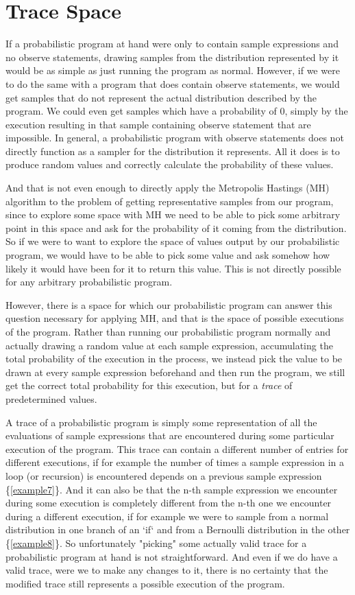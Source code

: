 \section{Trace Space}

If a probabilistic program at hand were only to contain sample expressions and no observe statements, drawing samples from the distribution represented by it would be as simple as just running the program as normal. However, if we were to do the same with a program that does contain observe statements, we would get samples that do not represent the actual distribution described by the program. We could even get samples which have a probability of $0$, simply by the execution resulting in that sample containing observe statement that are impossible. In general, a probabilistic program with observe statements does not directly function as a sampler for the distribution it represents. All it does is to produce random values and correctly calculate the probability of these values.

And that is not even enough to directly apply the Metropolis Hastings (MH) algorithm to the problem of getting representative samples from our program, since to explore some space with MH we need to be able to pick some arbitrary point in this space and ask for the probability of it coming from the distribution. So if we were to want to explore the space of values output by our probabilistic program, we would have to be able to pick some value and ask somehow how likely it would have been for it to return this value. This is not directly possible for any arbitrary probabilistic program.

However, there is a space for which our probabilistic program can answer this question necessary for applying MH, and that is the space of possible executions of the program. Rather than running our probabilistic program normally and actually drawing a random value at each sample expression, accumulating the total probability of the execution in the process, we instead pick the value to be drawn at every sample expression beforehand and then run the program, we still get the correct total probability for this execution, but for a \textit{trace} of predetermined values.

A trace of a probabilistic program is simply some representation of all the evaluations of sample expressions that are encountered during some particular execution of the program. This trace can contain a different number of entries for different executions, if for example the number of times a sample expression in a loop (or recursion) is encountered depends on a previous sample expression \{\ref{example7}\}. And it can also be that the n-th sample expression we encounter during some execution is completely different from the n-th one we encounter during a different execution, if for example we were to sample from a normal distribution in one branch of an `if` and from a Bernoulli distribution in the other \{\ref{example8}\}. So unfortunately "picking" some actually valid trace for a probabilistic program at hand is not straightforward. And even if we do have a valid trace, were we to make any changes to it, there is no certainty that the modified trace still represents a possible execution of the program.

